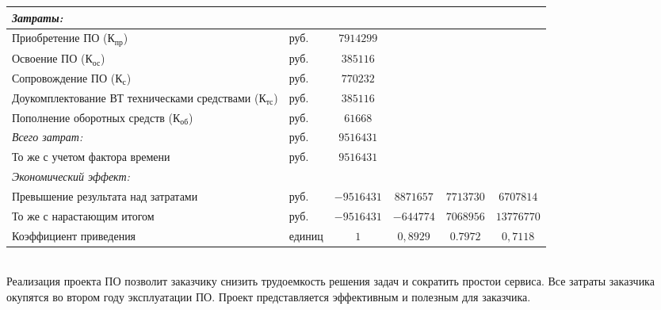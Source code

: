 {\begin{xtabular}{|p{0.3\textwidth}|>{\centering}p{0.15\textwidth}|c|c|c|c|}
    \hline
    \emph{Затраты:} & & & & & \\
    \hline
    Приобретение ПО ($\text{К}_\text{пр}$) & руб. & $7914299$ & & & \\
    \hline
    Освоение ПО ($\text{К}_\text{ос}$) & руб. & $385116$ & & & \\
    \hline
    Сопровождение ПО ($\text{К}_\text{с}$) & руб. & $770232$ & & & \\
    \hline
    Доукомплектование ВТ техническами средствами ($\text{К}_\text{тс}$) & руб. & $385116$ & & & \\
    \hline
    Пополнение оборотных средств ($\text{К}_\text{об}$) & руб. & $61668$ & & & \\
    \hline
    \emph{Всего затрат:} & руб. & $9516431$ & & & \\
    \hline
    То же с учетом фактора времени & руб. & $9516431$ & & & \\
    \hline
    \emph{Экономический эффект:} & & & & & \\
    \hline
    Превышение результата над затратами & руб. & $-9516431$ & $8871657$ & $7713730$ & $6707814$ \\
    \hline
    То же с нарастающим итогом & руб. & $-9516431$ & $-644774$ & $7068956$ & $13776770$ \\
    \hline
    Коэффициент приведения & единиц & $1$ & $0,8929$ & $0.7972$ & $0,7118$ \\
    \hline
  \end{xtabular}
}\\[0.5\baselineskip]

Реализация проекта ПО позволит заказчику снизить трудоемкость решения задач и сократить простои сервиса. Все затраты заказчика окупятся во втором году эксплуатации ПО. Проект представляется эффективным и полезным для заказчика.

\newpage
